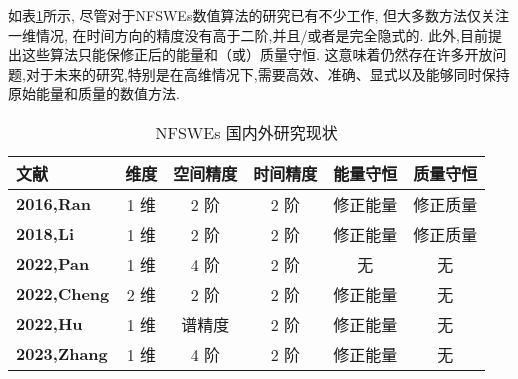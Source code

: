 如表\ref{tab:NFSWEs}所示, 尽管对于NFSWEs数值算法的研究已有不少工作, 但大多数方法仅关注一维情况, 在时间方向的精度没有高于二阶,并且/或者是完全隐式的.
此外,目前提出这些算法只能保修正后的能量和（或）质量守恒.
这意味着仍然存在许多开放问题,对于未来的研究,特别是在高维情况下,需要高效、准确、显式以及能够同时保持原始能量和质量的数值方法.
\begin{table}[htbp]
    \centering
    \small
    \caption{NFSWEs 国内外研究现状}
        \begin{tabular}{lccccc}
        \toprule
        \textcolor[rgb]{0,0,0}{\textbf{文献}} & \textcolor[rgb]{0,0,0}{\textbf{维度}} & \textcolor[rgb]{0,0,0}{\textbf{空间精度}} & \textcolor[rgb]{0,0,0}{\textbf{时间精度}} & \textcolor[rgb]{0,0,0}{\textbf{能量守恒}} & \textcolor[rgb]{0,0,0}{\textbf{质量守恒}} \\
        \midrule
        \textcolor[rgb]{0,0,0}{\textbf{\cite{ranLinearlyImplicitConservative2016}{2016,Ran}}} & 1 维   & 2 阶   & 2 阶   & 修正能量  & 修正质量 \\
        \midrule
        \textcolor[rgb]{0,0,0}{\textbf{\cite{liFastEnergyConserving2018}{2018,Li}}} & 1 维   & 2 阶   & 2 阶   & 修正能量  & 修正质量 \\
        \midrule
        \textcolor[rgb]{0,0,0}{\textbf{\cite{panFourthorderDifferenceScheme2022}{2022,Pan}}} & 1 维   & 4 阶   & 2 阶   & 无     & 无 \\
        \midrule
        \textcolor[rgb]{0,0,0}{\textbf{\cite{chengConvergenceEnergyconservingScheme2022}{2022,Cheng}}} & 2 维   & 2 阶   & 2 阶   & 修正能量  & 无 \\
        \midrule
        \textcolor[rgb]{0,0,0}{\textbf{\cite{huEfficientEnergyPreserving2022}{2022,Hu}}} & 1 维   & 谱精度   & 2 阶   & 修正能量  & 无 \\
        \midrule
        \textcolor[rgb]{0,0,0}{\textbf{\cite{zhangHighorderStructurepreservingDifference2023}{2023,Zhang}}} & 1 维   & 4 阶   & 2 阶   & 修正能量  & 无 \\
        \bottomrule
        \end{tabular}%
    \label{tab:NFSWEs}%
    \end{table}%
